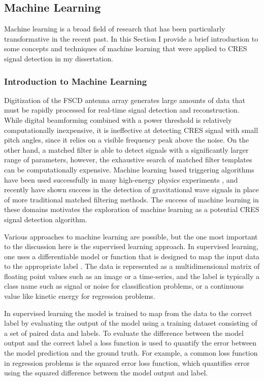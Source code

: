 \subsection{Machine Learning}

Machine learning is a broad field of research \cite{prml} that has been particularly transformative in the recent past. In this Section I provide a brief introduction to some concepts and techniques of machine learning that were applied to CRES signal detection in my dissertation.

\subsubsection*{Introduction to Machine Learning}
\label{sec:chap4-intro-ml}

Digitization of the FSCD antenna array generates large amounts of data that must be rapidly processed for real-time signal detection and reconstruction. While digital beamforming combined with a power threshold is relatively computationally inexpensive, it is ineffective at detecting CRES signal with small pitch angles, since it relies on a visible frequency peak above the noise. On the other hand, a matched filter is able to detect signals with a significantly larger range of parameters, however, the exhaustive search of matched filter templates can be computationally expensive. Machine learning based triggering algorithms have been used successfully in many high-energy physics experiments \cite{ml_lhc}, and recently have shown success in the detection of gravitational wave signals \cite{ml_ligo_1,ml_ligo_2} in place of more traditional matched filtering methods. The success of machine learning in these domains motivates the exploration of machine learning as a potential CRES signal detection algorithm. 

Various approaches to machine learning are possible, but the one most important to the discussion here is the supervised learning approach. In supervised learning, one uses a differentiable model or function that is designed to map the input data to the appropriate label \cite{prml}. The data is represented as a multidimensional matrix of floating point values such as an image or a time-series, and the label is typically a class name such as signal or noise for classification problems, or a continuous value like kinetic energy for regression problems. 

In supervised learning the model is trained to map from the data to the correct label by evaluating the output of the model using a training dataset consisting of a set of paired data and labels. To evaluate the difference between the model output and the correct label a loss function is used to quantify the error between the model prediction and the ground truth. For example, a common loss function in regression problems is the squared error loss function, which quantifies error using the squared difference between the model output and label. 

